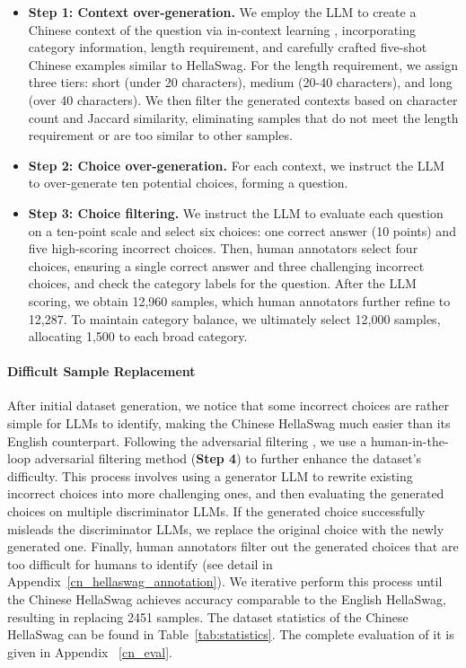 \begin{itemize}[leftmargin=*]
\setlength{\itemsep}{0pt}
    \item \textbf{Step 1: Context over-generation.}
    We employ the LLM to create a Chinese context of the question via in-context learning \cite{brown2020language}, incorporating category information, length requirement, and carefully crafted five-shot Chinese examples similar to HellaSwag. 
    For the length requirement, we assign three tiers: short (under 20 characters), medium (20-40 characters), and long (over 40 characters). 
    We then filter the generated contexts based on character count and Jaccard similarity, eliminating samples that do not meet the length requirement or are too similar to other samples. 
    \item \textbf{Step 2: Choice over-generation. } For each context, we instruct the LLM to over-generate ten potential choices, forming a question.   
    
    \item \textbf{Step 3: Choice filtering.} 
    We instruct the LLM to evaluate each question on a ten-point scale and select six choices: one correct answer (10 points) and five high-scoring incorrect choices. 
    Then, human annotators select four choices, ensuring a single correct answer and three challenging incorrect choices, and check the category labels for the question. 
    After the LLM scoring, we obtain 12,960 samples, which human annotators further refine to 12,287. To maintain category balance, we ultimately select 12,000 samples, allocating 1,500 to each broad category. 

\end{itemize}

\paragraph{Difficult Sample Replacement}
After initial dataset generation, we notice that some incorrect choices are rather simple for LLMs to identify, making the Chinese HellaSwag much easier than its English counterpart. 
Following the adversarial filtering \cite{zellers2018swag}, we use a human-in-the-loop adversarial filtering method (\textbf{Step 4}) to further enhance the dataset's difficulty.
This process involves using a generator LLM to rewrite existing incorrect choices into more challenging ones, and then evaluating the generated choices on multiple discriminator LLMs. 
If the generated choice successfully misleads the discriminator LLMs, we replace the original choice with the newly generated one. 
Finally, human annotators filter out the generated choices that are too difficult for humans to identify (see detail in Appendix~\ref{cn_hellaswag_annotation}). We iterative perform this process until the Chinese HellaSwag achieves accuracy comparable to the English HellaSwag, resulting in replacing 2451 samples. 
The dataset statistics of the Chinese HellaSwag can be found in Table~\ref{tab:statistics}. The complete evaluation of it is given in Appendix ~\ref{cn_eval}. 

